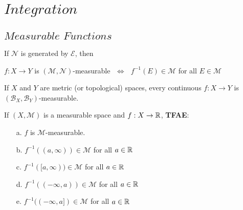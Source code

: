 \ifx\allfiles\undefined


	\else
	\fi
\chapter{$Integration$}
\section{$Measurable \,\, Functions$}
	\begin{proposition}\label{prop 3.1.1}
		If $\mathcal{N}$ is generated by $\mathcal{E}$, then
		\begin{center}
			$f : X \rightarrow Y$ is $(\mathcal{M} , \mathcal{N})$-measurable $\,\, \Leftrightarrow 
			\,\,$ $f^{-1}(E) \in \mathcal{M}$ for all $E \in \mathcal{M}$
		\end{center}
	\end{proposition}
	
	\vspace*{8em}
	
	\begin{corollary}\label{cor 3.1.1}
		If $X$ and $Y$ are metric (or topological) spaces, every continuous $f : X \rightarrow Y$ is $(\mathcal{B}_X , \mathcal{B}_Y)$-measurable.
	\end{corollary}
	
	\vspace*{8em}
	
	\begin{proposition}\label{prop 3.1.2}
		If $(X , \mathcal{M})$ is a measurable space and $f : X \rightarrow \mathbb{R}$, \textbf{TFAE}:
		\begin{enumerate}
			\item[a.] $f$ is $\mathcal{M}$-measurable.
			
			\item[b.] $f^{-1}((a , \infty)) \in \mathcal{M}$ for all $a \in \mathbb{R}$
			
			\item[c.] $f^{-1}([a , \infty)) \in \mathcal{M}$ for all $a \in \mathbb{R}$
			
			\item[d.] $f^{-1}((-\infty , a)) \in \mathcal{M}$ for all $a \in \mathbb{R}$
			
			\item[e.] $f^{-1}((-\infty , a]) \in \mathcal{M}$ for all $a \in \mathbb{R}$
		\end{enumerate}
	\end{proposition}
	
